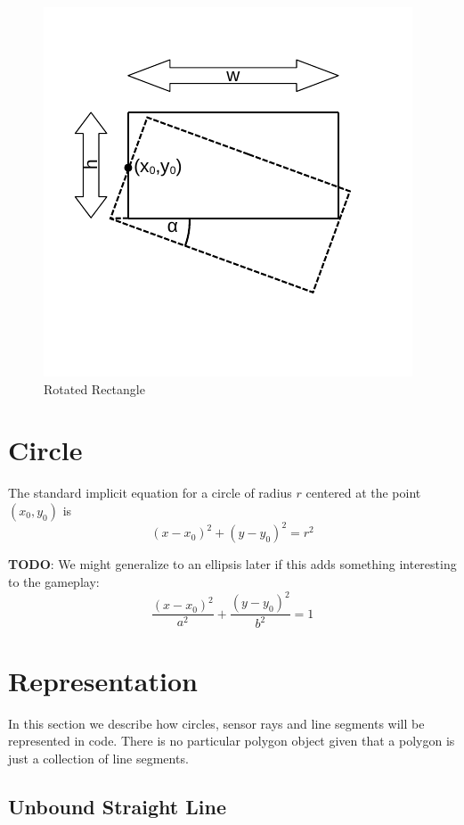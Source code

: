 \documentclass[11pt]{article}
\newcommand{\TODO}{{\bf TODO}}
\begin{document}
\begin{figure}
    \centering
    \includegraphics[trim=10 40 10 20]{rectangle.pdf}
    \caption{Rotated Rectangle}\label{fig-rectangle}
\end{figure}

\section{Circle}
\label{sec-circle}

The standard implicit equation for a circle of radius $r$  centered at the
point $(x_0, y_0)$ is
\begin{equation}
    (x - x_0)^2 + (y - y_0)^2 = r^2\label{eq-circle}
\end{equation}

\TODO: We might generalize to an ellipsis later if this adds something
interesting to the gameplay:
\begin{equation}
    \frac{(x-x_0)^2}{a^2} + \frac{(y-y_0)^2}{b^2} = 1
\end{equation}

\section{Representation}
\label{sec-representation}
In this section we describe how circles, sensor rays and line segments will be
represented in code. There is no particular polygon object given that a
polygon is just a collection of line segments.

\subsection{Unbound Straight Line}
\end{document}
